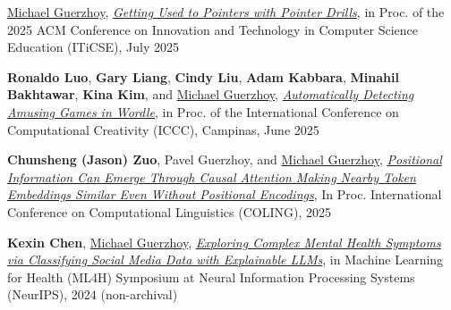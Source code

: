 \documentclass[letterpaper,11pt]{article}
\begin{document}
\begin{revnumerate}
\item \underline{Michael Guerzhoy}, \href{https://dl.acm.org/doi/10.1145/3724389.3731268}{\textit{Getting Used to Pointers with Pointer Drills}}, in Proc. of the 2025 ACM Conference on Innovation and Technology in Computer Science Education (ITiCSE), July 2025 

\item \textbf{Ronaldo Luo}, \textbf{Gary Liang}, \textbf{Cindy Liu}, \textbf{Adam Kabbara}, \textbf{Minahil Bakhtawar}, \textbf{Kina Kim}, and \underline{Michael Guerzhoy}, \href{https://arxiv.org/abs/2506.05415}{\textit{Automatically Detecting Amusing Games in Wordle}}, in Proc. of the International Conference on Computational Creativity (ICCC), Campinas, June 2025 



\item \textbf{Chunsheng (Jason) Zuo}, Pavel Guerzhoy, and \underline{Michael Guerzhoy}, \href{https://aclanthology.org/2025.coling-main.632/}{\textit{Positional Information Can Emerge Through Causal Attention Making Nearby Token Embeddings Similar Even Without Positional Encodings}}, In Proc. International Conference on Computational Linguistics (COLING), 2025 




\item \textbf{Kexin Chen}, \underline{Michael Guerzhoy}, \href{https://arxiv.org/abs/2412.10414}{\textit{Exploring Complex Mental Health Symptoms via Classifying Social Media Data with Explainable LLMs}}, in Machine Learning for Health (ML4H) Symposium at Neural Information Processing Systems (NeurIPS), 2024 (non-archival)


\end{revnumerate}
\end{document}
